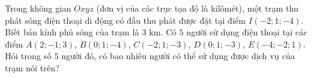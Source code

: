 \begin{bt}%
	Trong không gian $Oxyz$ (đơn vị của các trục tọa độ là kilômét), một trạm thu phát sóng điện thoại di động có đầu thu phát được đặt tại điểm $I\left(-2;1;-4\right)$. Biết bán kính phủ sóng của trạm là  $3$ km. Có $5$ người sử dụng điện thoại tại các điểm $A\left(2;-1;3\right)$, $B\left(0;1;-4\right)$, $C\left(-2;1;-3\right)$, $ D\left(0;1;-3\right)$, $ E\left(-4;-2;1\right)$. Hỏi trong số $5$ người đó, có bao nhiêu người có thể sử dụng được dịch vụ của trạm nói trên?
\end{bt}

